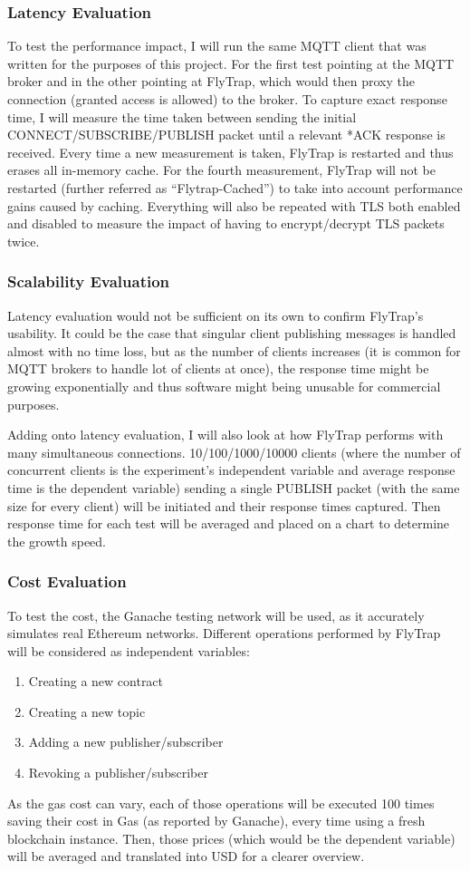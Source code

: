 \subsubsection{Latency Evaluation} To test the performance impact, I will run the same MQTT client that was written for the purposes of this project. For the first test pointing at the MQTT broker and in the other pointing at FlyTrap, which would then proxy the connection (granted access is allowed) to the broker. To capture exact response time, I will measure the time taken between sending the initial CONNECT/SUBSCRIBE/PUBLISH packet until a relevant *ACK response is received. Every time a new measurement is taken, FlyTrap is restarted and thus erases all in-memory cache. For the fourth measurement, FlyTrap will not be restarted (further referred as ``Flytrap-Cached'') to take into account performance gains caused by caching. Everything will also be repeated with TLS both enabled and disabled to measure the impact of having to encrypt/decrypt TLS packets twice.
\subsubsection{Scalability Evaluation}
Latency evaluation would not be sufficient on its own to confirm FlyTrap's usability. It could be the case that singular client publishing messages is handled almost with no time loss, but as the number of clients increases (it is common for MQTT brokers to handle lot of clients at once), the response time might be growing exponentially and thus software might being unusable for commercial purposes. 

Adding onto latency evaluation, I will also look at how FlyTrap performs with many simultaneous connections. 10/100/1000/10000 clients (where the number of concurrent clients is the experiment's independent variable and average response time is the dependent variable) sending a single PUBLISH packet (with the same size for every client) will be initiated and their response times captured. Then response time for each test will be averaged and placed on a chart to determine the growth speed.  
\subsubsection{Cost Evaluation}
To test the cost, the Ganache testing network will be used, as it accurately simulates real Ethereum networks. Different operations performed by FlyTrap will be considered as independent variables:
\begin{enumerate}
  \item Creating a new contract
  \item Creating a new topic
  \item Adding a new publisher/subscriber
  \item Revoking a publisher/subscriber
\end{enumerate}
As the gas cost can vary, each of those operations will be executed 100 times saving their cost in Gas (as reported by Ganache), every time using a fresh blockchain instance. Then, those prices (which would be the dependent variable) will be averaged and translated into USD for a clearer overview.

